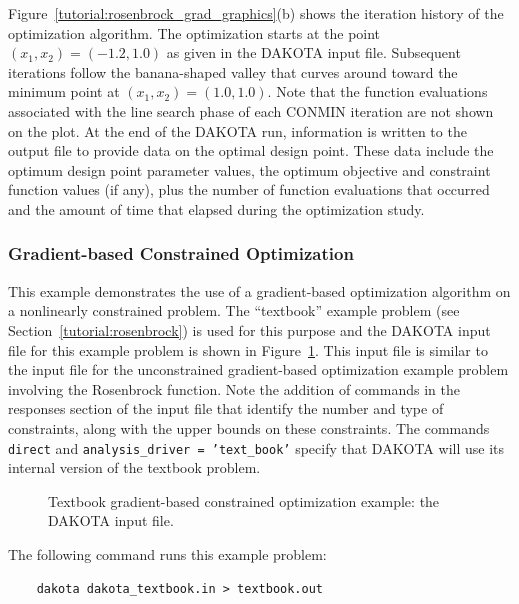 Figure~\ref{tutorial:rosenbrock_grad_graphics}(b) shows the
iteration history of the optimization algorithm.  The optimization
starts at the point $(x_1,x_2) = (-1.2,1.0)$ as given in the
DAKOTA input file.  Subsequent iterations follow the banana-shaped
valley that curves around toward the minimum point at $(x_1,x_2) =
(1.0,1.0)$. Note that the function evaluations associated with the
line search phase of each CONMIN iteration are not shown on the plot.
At the end of the DAKOTA run, information is written to the output
file to provide data on the optimal design point. These data include
the optimum design point parameter values, the optimum objective and
constraint function values (if any), plus the number of function
evaluations that occurred and the amount of time that elapsed during
the optimization study.

\subsubsection{Gradient-based Constrained Optimization}\label{tutorial:example:gradient2}

This example demonstrates the use of a gradient-based optimization
algorithm on a nonlinearly constrained problem. The ``textbook''
example problem (see Section~\ref{tutorial:rosenbrock}) is used
for this purpose and the DAKOTA input file for this example problem is
shown in Figure~\ref{tutorial:textbook_grad_constr}.  This
input file is similar to the input file for the unconstrained
gradient-based optimization example problem involving the Rosenbrock
function.  Note the addition of commands in the responses section of
the input file that identify the number and type of constraints, along
with the upper bounds on these constraints.  The commands
\texttt{direct} and \texttt{analysis\_driver = 'text\_book'} specify
that DAKOTA will use its internal version of the textbook problem.

\begin{figure}[ht!]
  \centering
  \begin{bigbox}
    \begin{small}
    \end{small}
  \end{bigbox}
  \caption{Textbook gradient-based constrained optimization example:
    the DAKOTA input file.}
  \label{tutorial:textbook_grad_constr}
\end{figure}

The following command runs this example problem:
\begin{small}
\begin{verbatim}
    dakota dakota_textbook.in > textbook.out
\end{verbatim}
\end{small}

